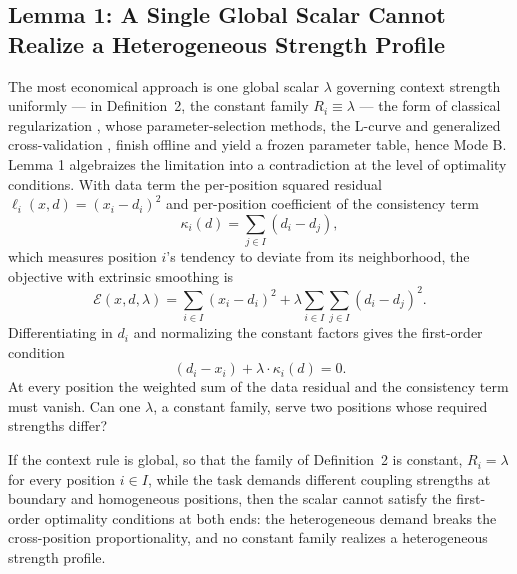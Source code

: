 \subsection{Lemma 1: A Single Global Scalar Cannot Realize a Heterogeneous Strength Profile}

The most economical approach is one global scalar $\lambda$ governing context strength uniformly --- in Definition~2, the constant family $R_i \equiv \lambda$ --- the form of classical regularization \citep{poggio1985}, whose parameter-selection methods, the L-curve and generalized cross-validation \citep{hansen1992,golub1979}, finish offline and yield a frozen parameter table, hence Mode B. Lemma 1 algebraizes the limitation into a contradiction at the level of optimality conditions. With data term the per-position squared residual $\ell_i (x, d) = (x_i - d_i)^2$ and per-position coefficient of the consistency term
\begin{equation}
\kappa_i (d) = \sum_{j \in I} (d_i - d_j),
\label{eq:kappa}
\end{equation}
which measures position $i$'s tendency to deviate from its neighborhood, the objective with extrinsic smoothing is
\begin{equation}
\mathcal{E}(x, d, \lambda) = \sum_{i \in I} (x_i - d_i)^2 + \lambda \sum_{i \in I} \sum_{j \in I} (d_i - d_j)^2.
\label{eq:paradigmE}
\end{equation}
Differentiating in $d_i$ and normalizing the constant factors gives the first-order condition
\begin{equation}
(d_i - x_i) + \lambda \cdot \kappa_i (d) = 0.
\label{eq:foc}
\end{equation}
At every position the weighted sum of the data residual and the consistency term must vanish. Can one $\lambda$, a constant family, serve two positions whose required strengths differ?

\begin{lemma}
If the context rule is global, so that the family of Definition~2 is constant, $R_i = \lambda$ for every position $i \in I$, while the task demands different coupling strengths at boundary and homogeneous positions, then the scalar cannot satisfy the first-order optimality conditions at both ends: the heterogeneous demand breaks the cross-position proportionality, and no constant family realizes a heterogeneous strength profile.
\end{lemma}

